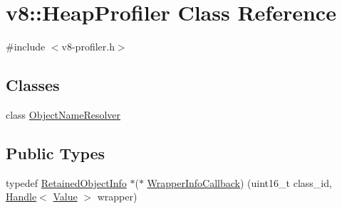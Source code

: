\hypertarget{classv8_1_1_heap_profiler}{}\section{v8\+:\+:Heap\+Profiler Class Reference}
\label{classv8_1_1_heap_profiler}


{\ttfamily \#include $<$v8-\/profiler.\+h$>$}

\subsection*{Classes}
\begin{DoxyCompactItemize}
\item 
class \hyperlink{classv8_1_1_heap_profiler_1_1_object_name_resolver}{Object\+Name\+Resolver}
\end{DoxyCompactItemize}
\subsection*{Public Types}
\begin{DoxyCompactItemize}
\item 
typedef \hyperlink{classv8_1_1_retained_object_info}{Retained\+Object\+Info} $\ast$($\ast$ \hyperlink{classv8_1_1_heap_profiler_a696d8d6590879eeb5a4ad2814eafb599}{Wrapper\+Info\+Callback}) (uint16\+\_\+t class\+\_\+id, \hyperlink{classv8_1_1_local}{Handle}$<$ \hyperlink{classv8_1_1_value}{Value} $>$ wrapper)
\end{DoxyCompactItemize}
